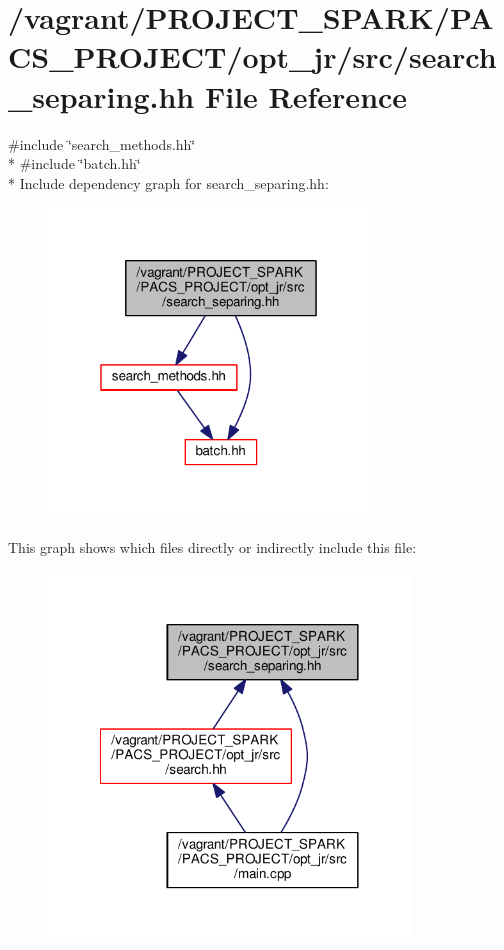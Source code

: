 \hypertarget{search__separing_8hh}{\section{/vagrant/\-P\-R\-O\-J\-E\-C\-T\-\_\-\-S\-P\-A\-R\-K/\-P\-A\-C\-S\-\_\-\-P\-R\-O\-J\-E\-C\-T/opt\-\_\-jr/src/search\-\_\-separing.hh File Reference}
\label{search__separing_8hh}
}
{\ttfamily \#include \char`\"{}search\-\_\-methods.\-hh\char`\"{}}\\*
{\ttfamily \#include \char`\"{}batch.\-hh\char`\"{}}\\*
Include dependency graph for search\-\_\-separing.\-hh\-:\nopagebreak
\begin{figure}[H]
\begin{center}
\leavevmode
\includegraphics[width=241pt]{search__separing_8hh__incl}
\end{center}
\end{figure}
This graph shows which files directly or indirectly include this file\-:\nopagebreak
\begin{figure}[H]
\begin{center}
\leavevmode
\includegraphics[width=272pt]{search__separing_8hh__dep__incl}
\end{center}
\end{figure}
